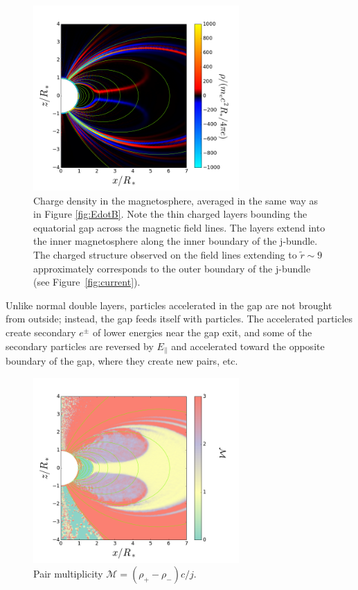 \begin{figure}[t]
  \centering
  \includegraphics[width=0.7\textwidth]{pics/chap4/Rho.png}
  \caption[Charge density in magnetar magnetosphere]{Charge density in the magnetosphere, averaged in the
    same way as in Figure \ref{fig:EdotB}. Note the thin charged layers bounding
    the equatorial gap across the magnetic field lines. The layers extend into
    the inner magnetosphere along the inner boundary of the j-bundle. The
    charged structure observed on the field lines extending to $\tilde{r}\sim 9$
    approximately corresponds to the outer boundary of the j-bundle (see
    Figure~\ref{fig:current}).}
  \label{fig:rho}
\end{figure}

Unlike normal double layers, particles accelerated in the gap are not brought
from outside; instead, the gap feeds itself with particles. The accelerated
particles create secondary $e^\pm$ of lower energies near the gap exit, and some
of the secondary particles are reversed by $E_\parallel$ and accelerated toward
the opposite boundary of the gap, where they create new pairs, etc.


\begin{figure}[t]
  \centering
  \includegraphics[width=0.7\textwidth]{pics/chap4/multiplicity.png}
  \caption[Magnetar magnetospheric pair multiplicity]{Pair multiplicity
    $\mathcal{M} = (\rho_+ - \rho_{-})c/j$.}
  \label{fig:multiplicity}
\end{figure}

